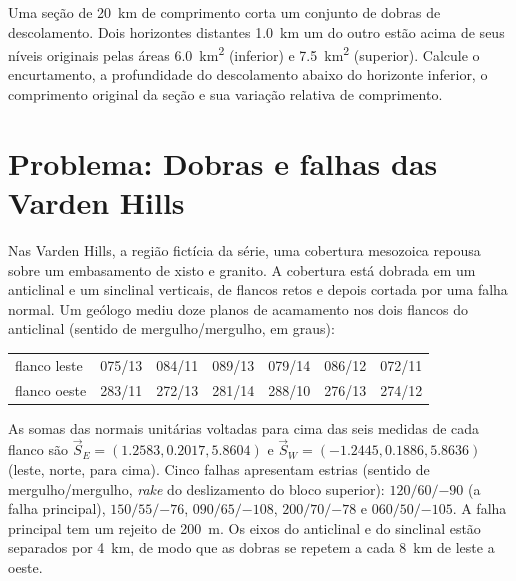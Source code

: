 \begin{exercise}[$\star\star\star$]\label{exo:b3:structural-analysis:12}
Uma seção de \qty{20}{km} de comprimento corta um conjunto de dobras de descolamento.
Dois horizontes distantes \qty{1.0}{km} um do outro estão acima de seus níveis
originais pelas áreas \qty{6.0}{km^2} (inferior) e \qty{7.5}{km^2} (superior). Calcule o
encurtamento, a profundidade do descolamento abaixo do horizonte inferior, o
comprimento original da seção e sua variação relativa de comprimento.
\end{exercise}

\section{Problema: Dobras e falhas das Varden Hills}

\begin{problem}
\label{pb:b3:structural-analysis:1}
Nas Varden Hills, a região fictícia da série, uma cobertura mesozoica repousa sobre um
embasamento de xisto e granito. A cobertura está dobrada em um anticlinal e um sinclinal verticais,
de flancos retos e depois cortada por uma falha normal. Um
geólogo mediu doze planos de acamamento nos dois flancos do anticlinal
(sentido de mergulho/mergulho, em graus):

\begin{center}
\small
\begin{tabular}{l|cccccc}
\hline
flanco leste & 075/13 & 084/11 & 089/13 & 079/14 & 086/12 & 072/11 \\
flanco oeste & 283/11 & 272/13 & 281/14 & 288/10 & 276/13 & 274/12 \\
\hline
\end{tabular}
\end{center}

As somas das normais unitárias voltadas para cima das seis medidas de cada flanco são
$\vec S_E = (1.2583, 0.2017, 5.8604)$ e $\vec S_W = (-1.2445, 0.1886,
5.8636)$ (leste, norte, para cima). Cinco falhas apresentam estrias (sentido de mergulho/mergulho,
\textit{rake} do deslizamento do bloco superior): $120/60/{-90}$ (a falha principal), $150/55/{-76}$,
$090/65/{-108}$, $200/70/{-78}$ e $060/50/{-105}$. A falha principal tem um
rejeito de \qty{200}{m}. Os eixos do anticlinal e do sinclinal estão separados por \qty{4}{km},
de modo que as dobras se repetem a cada \qty{8}{km} de leste a oeste.


\end{problem}
